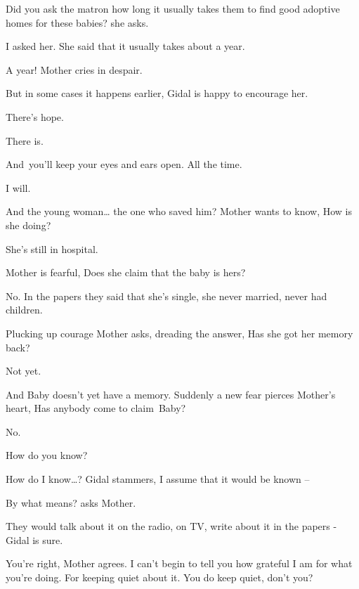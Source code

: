 \documentclass[letterpaper]{article}
\begin{document}
{\textquotedbl}Did you ask the matron how long it usually takes them to find good adoptive homes for these
babies?{\textquotedbl} she asks.

{\textquotedbl}I asked her. She said that it usually takes about a year.{\textquotedbl} 

{\textquotedbl}A year!{\textquotedbl} Mother cries in despair. 

{\textquotedbl}But in some cases it happens earlier,{\textquotedbl} Gidal is happy to encourage her. 

{\textquotedbl}There's hope.{\textquotedbl} 

{\textquotedbl}There is.{\textquotedbl} 

{\textquotedbl}And~you'll keep your eyes and ears open. All the time.{\textquotedbl} 

{\textquotedbl}I will.{\textquotedbl} 

{\textquotedbl}And the young woman{\dots} the one who saved him?{\textquotedbl} Mother wants to know, {\textquotedbl}How
is she doing?{\textquotedbl} 

{\textquotedbl}She's still in hospital.{\textquotedbl} 

Mother is fearful, {\textquotedbl}Does she claim\textcolor{red}{ }that the baby is hers?{\textquotedbl} 

{\textquotedbl}No. In the papers they said that she's single, she never married, never had children.{\textquotedbl} 

Plucking up courage Mother asks, dreading the answer, {\textquotedbl}Has she got her memory back?{\textquotedbl} 

{\textquotedbl}Not yet.{\textquotedbl} 

{\textquotedbl}And Baby doesn't yet have a memory.{\textquotedbl} Suddenly a new fear pierces Mother's heart,
{\textquotedbl}Has anybody come to claim~Baby?{\textquotedbl} 

{\textquotedbl}No.{\textquotedbl} 

{\textquotedbl}How do you know?{\textquotedbl}

{\textquotedbl}How do I know{\dots}?{\textquotedbl} Gidal stammers, {\textquotedbl}I assume that it would be known
--{\textquotedbl} 

{\textquotedbl}By what means?{\textquotedbl} asks Mother.

{\textquotedbl}They would talk about it on the radio, on TV, write about it in the papers -{\textquotedbl} Gidal is
sure.

{\textquotedbl}You're right,{\textquotedbl} Mother agrees. {\textquotedbl}I can't begin to tell you how grateful I am
for what you're doing. For keeping quiet about it. You do keep quiet, don't you?{\textquotedbl} 
\end{document}

